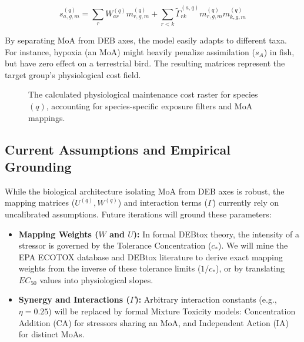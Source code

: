 \documentclass[11pt,a4paper]{article}
\begin{document}
\begin{equation}
 s_{a,g,m}^{(q)} = \sum_{r} W_{ar}^{(q)} m_{r,g,m}^{(q)} + \sum_{r<k} \tilde{\Gamma}_{rk}^{(a,q)} m_{r,g,m}^{(q)} m_{k,g,m}^{(q)}
\end{equation}

By separating MoA from DEB axes, the model easily adapts to different taxa. For instance, hypoxia (an MoA) might heavily penalize assimilation ($s_A$) in fish, but have zero effect on a terrestrial bird. The resulting matrices represent the target group's physiological cost field.

\begin{figure}[H]
\centering
{}
\caption{The calculated physiological maintenance cost raster for species $(q)$, accounting for species-specific exposure filters and MoA mappings.}
\end{figure}

\subsection*{Current Assumptions and Empirical Grounding}
While the biological architecture isolating MoA from DEB axes is robust, the mapping matrices ($U^{(q)}, W^{(q)}$) and interaction terms ($\Gamma$) currently rely on uncalibrated assumptions. Future iterations will ground these parameters:
\begin{itemize}
    \item \textbf{Mapping Weights ($W$ and $U$):} In formal DEBtox theory, the intensity of a stressor is governed by the Tolerance Concentration ($c_*$). We will mine the EPA ECOTOX database and DEBtox literature to derive exact mapping weights from the inverse of these tolerance limits ($1/c_*$), or by translating $EC_{50}$ values into physiological slopes.
    \item \textbf{Synergy and Interactions ($\Gamma$):} Arbitrary interaction constants (e.g., $\eta=0.25$) will be replaced by formal Mixture Toxicity models: Concentration Addition (CA) for stressors sharing an MoA, and Independent Action (IA) for distinct MoAs.
\end{itemize}
\end{document}
